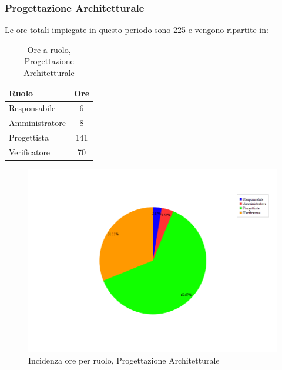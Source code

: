 \subsubsection{Progettazione Architetturale}
Le ore totali impiegate in questo periodo sono 225 e vengono ripartite in:
\begin{table}[H]
	\begin{center}
		\begin{tabular}{|l|c|}
			\hline
			\textbf{Ruolo}	& \textbf{Ore} \\
			\hline
			Responsabile	&	6	\\
			\hline
			Amministratore	&	8	\\
			\hline
			Progettista		&	141	\\
			\hline
			Verificatore	&	70	\\
			\hline
		\end{tabular}
	\end{center}
	\caption{Ore a ruolo, Progettazione Architetturale}
\end{table}

\begin{figure}[H]
	\centering
	\includegraphics[scale=0.3]{immagini/Grafi/OreRuoloPA}
	\caption{Incidenza ore per ruolo, Progettazione Architetturale}
\end{figure}


